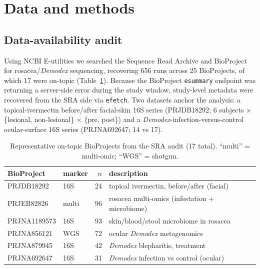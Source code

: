 \documentclass[11pt]{article}
\newcommand{\demodex}{\textit{Demodex}}
\begin{document}
\section{Data and methods}

\subsection{Data-availability audit}
Using NCBI E-utilities we searched the Sequence Read Archive and BioProject for
rosacea/\demodex{} sequencing, recovering 656 runs across 25 BioProjects, of
which 17 were on-topic (Table~\ref{tab:audit}). Because the BioProject
\texttt{esummary} endpoint was returning a server-side error during the study
window, study-level metadata were recovered from the SRA side via
\texttt{efetch}. Two datasets anchor the analysis: a topical-ivermectin
before/after facial-skin 16S series (PRJDB18292; 6 subjects $\times$ \{lesional,
non-lesional\} $\times$ \{pre, post\}) and a \demodex-infection-versus-control
ocular-surface 16S series (PRJNA692647; 14 vs 17).

\begin{table}[t]
\centering
\small
\begin{tabular}{llr l}
\toprule
BioProject & marker & $n$ & description \\
\midrule
PRJDB18292   & 16S & 24 & topical ivermectin, before/after (facial) \\
PRJEB82826   & multi & 96 & rosacea multi-omics (infestation + microbiome) \\
PRJNA1189573 & 16S & 93 & skin/blood/stool microbiome in rosacea \\
PRJNA856121  & WGS & 72 & ocular \demodex{} metagenomics \\
PRJNA879945  & 16S & 42 & \demodex{} blepharitis, treatment \\
PRJNA692647  & 16S & 31 & \demodex{} infection vs control (ocular) \\
\bottomrule
\end{tabular}
\caption{Representative on-topic BioProjects from the SRA audit (17 total).
``multi'' = multi-omic; ``WGS'' = shotgun.}
\label{tab:audit}
\end{table}
\end{document}
